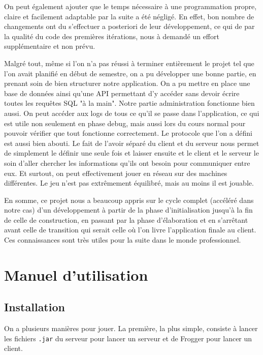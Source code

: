 \documentclass[a4paper,12pt]{article}
\begin{document}
	On peut également ajouter que le temps nécessaire à une programmation propre, claire et facilement adaptable par la suite a été négligé. En effet, bon nombre de changements ont du s'effectuer a posteriori de leur développement, ce qui de par la qualité du code des premières itérations, nous à demandé un effort supplémentaire et non prévu. 
	
	Malgré tout, même si l'on n'a pas réussi à terminer entièrement le projet tel que l'on avait planifié en début de semestre, on a pu développer une bonne partie, en prenant soin de bien structurer notre application. On a pu mettre en place une base de données ainsi qu'une API permettant d'y accéder sans devoir écrire toutes les requêtes SQL "à la main". Notre partie administration fonctionne bien aussi. On peut accéder aux logs de tous ce qu'il se passe dans l'application, ce qui est utile non seulement en phase debug, mais aussi lors du cours normal pour pouvoir vérifier que tout fonctionne correctement. Le protocole que l'on a défini est aussi bien abouti. Le fait de l'avoir séparé du client et du serveur nous permet de simplement le définir une seule fois et laisser ensuite et le client et le serveur le soin d'aller chercher les informations qu'ils ont besoin pour communiquer entre eux. Et surtout, on peut effectivement jouer en réseau sur des machines différentes. Le jeu n'est pas extrêmement équilibré, mais au moins il est jouable.
	
	En somme, ce projet nous a beaucoup appris sur le cycle complet (accéléré dans notre cas) d'un développement à partir de la phase d'initialisation jusqu'à la fin de celle de construction, en passant par la phase d'élaboration et en s'arrêtant avant celle de transition qui serait celle où l'on livre l'application finale au client. Ces connaissances sont très utiles pour la suite dans le monde professionnel.
	
	\appendix
	\section{Manuel d'utilisation} \label{app:manuelUtil}
	
	\subsection{Installation}
	On a plusieurs manières pour jouer. La première, la plus simple, consiste à lancer les fichiers \texttt{.jar} du serveur pour lancer un serveur et de Frogger pour lancer un client.
	
\end{document}
